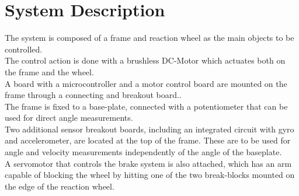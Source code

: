 \chapter{System Description}\label{systemDescription}
The system is composed of a frame and reaction wheel as the main objects to be controlled.\\
The control action is done with a brushless DC-Motor which actuates both on the frame and the wheel.\\ 
A board with a microcontroller and a motor control board are mounted on the frame through a connecting and breakout board..\\ 
The frame is fixed to a base-plate, connected with a potentiometer that can be used for direct angle measurements.\\ 
Two additional sensor breakout boards, including an integrated circuit with gyro and accelerometer, are located at the top of the frame. These are to be used for angle and velocity measurements independently of the angle of the baseplate.\\ 
A servomotor that controls the brake system is also attached, which has an arm capable of blocking the wheel by hitting one of the two break-blocks mounted on the edge of the reaction wheel.

